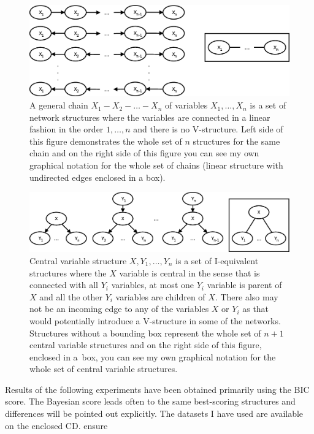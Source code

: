 \documentclass[english,cover]{fitthesis} %
\newcommand{\todo}[1]{{\color{red}#1}}
\begin{document}
\begin{figure}[ht]
    \centering
    \includegraphics[scale=0.39]{fig/structure-learning-chain}
    \caption{A general chain $X_1 - X_2 - \dots - X_n$ of variables $X_1, \dots, X_n$ is a set of network structures where the variables are connected in a linear fashion in the order $1, \dots, n$ and there is no V-structure. Left side of this figure demonstrates the whole set of $n$ structures for the same chain and on the right side of this figure you can see my own graphical notation for the whole set of chains (linear structure with undirected edges enclosed in a box).}
    \label{fig:structure_learning_chain}
\end{figure}
\begin{figure}[ht]
    \centering
    \includegraphics[scale=0.39]{fig/structure-learning-central-variable}
    \caption{Central variable structure $X,Y_1,\dots,Y_n$ is a set of I-equivalent structures where the $X$ variable is central in the sense that is connected with all $Y_i$ variables, at most one $Y_i$ variable is parent of $X$ and all the other $Y_i$ variables are children of $X$. There also may not be an incoming edge to any of the variables $X$ or $Y_i$ as that would potentially introduce a V-structure in some of the networks.
Structures without a bounding box represent the whole set of $n+1$ central variable structures and on the right side of this figure, enclosed in a~box, you can see my own graphical notation for the whole set of central variable structures.}
    \label{fig:structure_learning_central_variable}
\end{figure}

Results of the following experiments have been obtained primarily using the BIC score. The Bayesian score leads often to the same best-scoring structures and differences will be pointed out explicitly. The datasets I have used are available on the enclosed CD. \todo{ensure}
\end{document}
